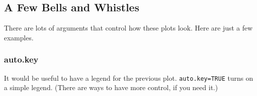 \subsection{A Few Bells and Whistles}
There are lots of arguments that control how these plots look.  Here are just a few examples.

\subsubsection{auto.key}
It would be useful to have a legend for the previous plot.   \verb!auto.key=TRUE! 
turns on a simple legend.  (There are ways to have more control, if you need it.)
\begin{knitrout}
\end{knitrout}


